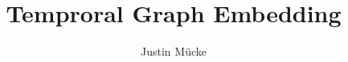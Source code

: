 \documentclass{scrartcl}
\begin{document}
\title{Temproral Graph Embedding}
\author{Justin Mücke}
\maketitle


\newpage





\end{document}
